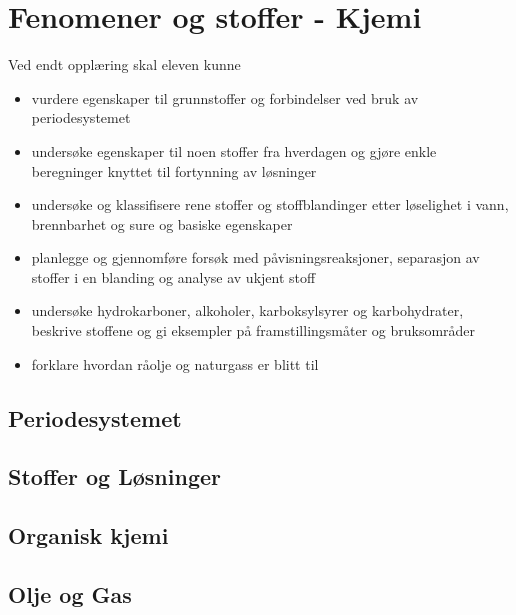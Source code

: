 \documentclass[main.tex]{subfiles}
\begin{document}
\section{Fenomener og stoffer - Kjemi} 
Ved endt opplæring skal eleven kunne
\begin{itemize}[noitemsep]
\item vurdere egenskaper til grunnstoffer og forbindelser ved bruk av periodesystemet
\item undersøke egenskaper til noen stoffer fra hverdagen og gjøre enkle beregninger knyttet til fortynning av løsninger
\item undersøke og klassifisere rene stoffer og stoffblandinger etter løselighet i vann, brennbarhet og sure og basiske egenskaper
\item planlegge og gjennomføre forsøk med påvisningsreaksjoner, separasjon av stoffer i en blanding og analyse av ukjent stoff
\item undersøke hydrokarboner, alkoholer, karboksylsyrer og karbohydrater, beskrive stoffene og gi eksempler på framstillingsmåter og bruksområder
\item forklare hvordan råolje og naturgass er blitt til
\end{itemize}

\subsection{Periodesystemet}

\subsection{Stoffer og Løsninger}

\subsection{Organisk kjemi}

\subsection{Olje og Gas}
\end{document}
